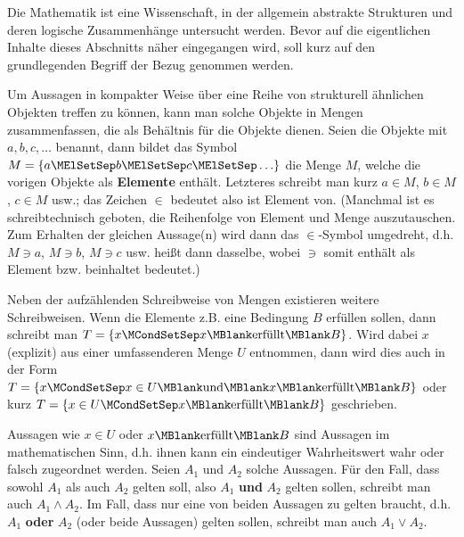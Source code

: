 \begin{MIntro}

Die Mathematik ist eine Wissenschaft, in der allgemein abstrakte Strukturen
und deren logische Zusammenhänge untersucht werden. 
Bevor auf die eigentlichen Inhalte dieses Abschnitts näher eingegangen wird,
soll kurz auf den grundlegenden Begriff der  Bezug
genommen werden.

\begin{MInfo}
Um Aussagen in kompakter Weise über eine Reihe von strukturell ähnlichen
Objekten treffen zu können, kann man solche Objekte in Mengen zusammenfassen,
die als Behältnis für die Objekte dienen. Seien die Objekte mit $a,b,c,\ldots$
benannt, dann bildet das Symbol $M=\{a\MElSetSep b \MElSetSep c \MElSetSep
\ldots\}$ die Menge $M$, welche die vorigen Objekte als \textbf{Elemente}
enthält. Letzteres schreibt man kurz $a\in M$, $b\in M$, $c\in M$ usw.;
das Zeichen \glqq{}$\in$\grqq{} bedeutet also \glqq{}ist Element von\grqq{}.
(Manchmal ist es schreibtechnisch geboten, die Reihenfolge von Element und
Menge auszutauschen. Zum Erhalten der gleichen Aussage(n) wird dann das
$\in$-Symbol umgedreht, d.h. $M\ni a$, $M\ni b$, $M\ni c$ usw. heißt
dann dasselbe, wobei \glqq{}$\ni$\grqq{} somit \glqq{}enthält als Element\grqq{}
bzw.  \glqq{}beinhaltet\grqq{} bedeutet.)

Neben der aufzählenden Schreibweise von Mengen existieren weitere 
Schreibweisen. Wenn die Elemente z.B. eine Bedingung $B$ erfüllen sollen,
dann schreibt man $T=\{x\MCondSetSep x\MBlank\text{erfüllt}\MBlank B\}$.
Wird dabei $x$ (explizit) aus einer umfassenderen Menge $U$ entnommen,
dann wird dies auch in der Form
$T=\{x\MCondSetSep x\in U \MBlank\text{und}\MBlank 
x\MBlank\text{erfüllt}\MBlank B\}$
oder kurz
$T=\{x\in U\MCondSetSep x\MBlank\text{erfüllt}\MBlank B\}$
geschrieben.

Aussagen wie \glqq{}$x\in U$\grqq{} oder
\glqq{}$x\MBlank\text{erfüllt}\MBlank B$\grqq{} sind Aussagen im 
mathematischen Sinn, d.h. ihnen kann ein eindeutiger Wahrheitswert
\glqq{}wahr\grqq{} oder \glqq{}falsch\grqq{} zugeordnet werden.
Seien $A_1$ und $A_2$ solche Aussagen. Für den Fall, dass sowohl
$A_1$ als auch $A_2$ gelten soll, also $A_1$ \textbf{und} $A_2$ gelten
sollen, schreibt man auch $A_1 \wedge A_2$. Im Fall, dass nur eine von
beiden Aussagen zu gelten braucht, d.h. $A_1$ \textbf{oder} $A_2$
(oder beide Aussagen) gelten sollen, schreibt man auch $A_1\vee A_2$.


\end{MInfo}
\end{MIntro}
